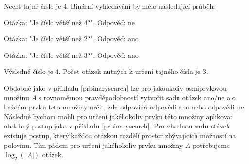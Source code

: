 \begin{prikl}\label{prbinarysearch}
Nechť tajné číslo je 4. Binární vyhledávání by mělo následující průběh:

Otázka: "Je číslo větší než 4?". 
Odpověď: ne

Otázka: "Je číslo větší než 2?". 
Odpověď: ano

Otázka: "Je číslo větší než 3?". 
Odpověď: ano

Výsledné číslo je 4. Počet otázek nutných k určení tajného čísla je 3.
\end{prikl}

\begin{pozn}\label{poznotazkynamnozinu}
Obdobně jako v příkladu \ref{prbinarysearch} lze pro jakoukoliv osmiprvkovou množinu $A$ s rovnoměrnou pravděpodobností vytvořit sadu otázek ano/ne a o každém prvku této množiny určit, zda odpovídá odpovědi ano nebo odpovědi ne. Následně bychom mohli pro určení jakéhokoliv prvku této množiny aplikovat obdobný postup jako v příkladu \ref{prbinarysearch}. Pro vhodnou sadu otázek existuje postup, který každou otázkou rozdělí prostor zbývajících možností na polovinu. Tím pádem pro určení jakéhokoliv prvku množiny $A$ potřebujeme $\log_2(|A|)$ otázek. 
\end{pozn}

